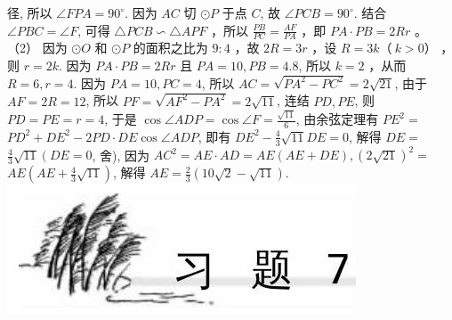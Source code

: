 \documentclass[10pt]{article}
\begin{document}
径, 所以 $\angle F P A=90^{\circ}$. 因为 $A C$ 切 $\odot P$ 于点 $C$, 故 $\angle P C B=90^{\circ}$. 结合 $\angle P B C=\angle F$, 可得 $\triangle P C B \backsim \triangle A P F$ ，所以 $\frac{P B}{P C}=\frac{A F}{P A}$ ，即 $P A \cdot P B=2 R r$ 。\\
（2） 因为 $\odot O$ 和 $\odot P$ 的面积之比为 $9: 4$ ，故 $2 R=3 r$ ，设 $R=3 k（~ k>0）$ ，则 $r=2 k$. 因为 $P A \cdot P B=2 R r$ 且 $P A=10, P B=4.8$, 所以 $k=2$ ，从而 $R=6, r=4$. 因为 $P A=10, P C=4$, 所以 $A C=\sqrt{P A^{2}-P C^{2}}=2 \sqrt{21}$, 由于 $A F=2 R=12$, 所以 $P F=\sqrt{A F^{2}-P A^{2}}=2 \sqrt{11}$, 连结 $P D, P E$, 则 $P D=P E=r=4$, 于是 $\cos \angle A D P=\cos \angle F=\frac{\sqrt{11}}{6}$, 由余弦定理有 $P E^{2}=$ $P D^{2}+D E^{2}-2 P D \cdot D E \cos \angle A D P$, 即有 $D E^{2}-\frac{4}{3} \sqrt{11} D E=0$, 解得 $D E=$ $\frac{4}{3} \sqrt{11}\left(D E=0\right.$, 舍), 因为 $A C^{2}=A E \cdot A D=A E(A E+D E),(2 \sqrt{21})^{2}=$ $A E\left(A E+\frac{4}{3} \sqrt{11}\right)$, 解得 $A E=\frac{2}{3}(10 \sqrt{2}-\sqrt{11})$.\\
\includegraphics[max width=\textwidth, center]{2024_10_30_66b8e5e701da2093c133g-056}
\end{document}
